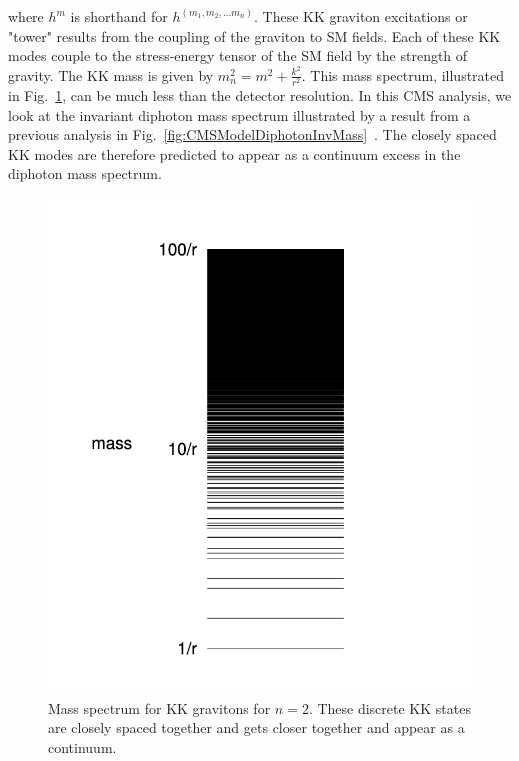 where $h^{m}$ is shorthand for $h^{(m_1,m_2,...m_n)}$. 
These KK graviton excitations or "tower" results from the coupling of the graviton to SM fields. Each of these KK modes couple to the stress-energy tensor of the SM field by the strength of gravity. The KK mass is given by $m^2_n = m^2 + \frac{k^2}{r^2}$. This mass spectrum, illustrated in Fig.~\ref{fig:KKmassSpectrum}, can be much less than the detector resolution. In this CMS analysis, we look at the invariant diphoton mass spectrum illustrated by a result from a previous analysis in Fig.~\ref{fig:CMSModelDiphotonInvMass}~\cite{CMS:2011uvc}. The closely spaced KK modes are therefore predicted to appear as a continuum excess in the diphoton mass spectrum. 

\begin{figure}
    \centering
    \includegraphics[scale=0.4]{fig/KKMassSpectrum.png}
    \caption{Mass spectrum for KK gravitons for $n=2$. These discrete KK states are closely spaced together and gets closer together and appear as a continuum.}
    \label{fig:KKmassSpectrum}
\end{figure}


